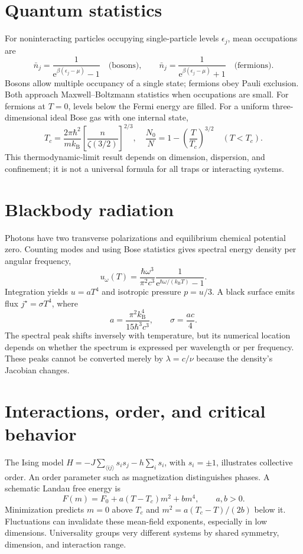 \documentclass[11pt,oneside]{book}
\newcommand{\ee}{\mathrm{e}}
\newcommand{\kb}{k_{\mathrm B}}
\theoremstyle{reviewstyle}
\begin{document}
\section{Quantum statistics}
For noninteracting particles occupying single-particle levels $\epsilon_j$, mean occupations are
\begin{equation}
\bar n_j=\frac1{\ee^{\beta(\epsilon_j-\mu)}-1}\quad\text{(bosons)},\qquad
\bar n_j=\frac1{\ee^{\beta(\epsilon_j-\mu)}+1}\quad\text{(fermions)}.
\end{equation}
Bosons allow multiple occupancy of a single state; fermions obey Pauli exclusion. Both approach Maxwell--Boltzmann statistics when occupations are small. For fermions at $T=0$, levels below the Fermi energy are filled. For a uniform three-dimensional ideal Bose gas with one internal state,
\begin{equation}
T_c=\frac{2\pi\hbar^2}{m\kb}\left[\frac{n}{\zeta(3/2)}\right]^{2/3},\quad
\frac{N_0}{N}=1-\left(\frac{T}{T_c}\right)^{3/2}\quad(T<T_c).
\end{equation}
This thermodynamic-limit result depends on dimension, dispersion, and confinement; it is not a universal formula for all traps or interacting systems.
\section{Blackbody radiation}
Photons have two transverse polarizations and equilibrium chemical potential zero. Counting modes and using Bose statistics gives spectral energy density per angular frequency,
\begin{equation}
u_\omega(T)=\frac{\hbar\omega^3}{\pi^2c^3}\frac1{\ee^{\hbar\omega/(\kb T)}-1}.
\end{equation}
Integration yields $u=aT^4$ and isotropic pressure $p=u/3$. A black surface emits flux $j^\star=\sigma T^4$, where
\begin{equation}a=\frac{\pi^2\kb^4}{15\hbar^3c^3},\qquad \sigma=\frac{ac}{4}.\end{equation}
The spectral peak shifts inversely with temperature, but its numerical location depends on whether the spectrum is expressed per wavelength or per frequency. These peaks cannot be converted merely by $\lambda=c/\nu$ because the density's Jacobian changes.
\section{Interactions, order, and critical behavior}
The Ising model $H=-J\sum_{\langle ij\rangle}s_is_j-h\sum_i s_i$, with $s_i=\pm1$, illustrates collective order. An order parameter such as magnetization distinguishes phases. A schematic Landau free energy is
\begin{equation}F(m)=F_0+a(T-T_c)m^2+bm^4,\qquad a,b>0.\end{equation}
Minimization predicts $m=0$ above $T_c$ and $m^2=a(T_c-T)/(2b)$ below it. Fluctuations can invalidate these mean-field exponents, especially in low dimensions. Universality groups very different systems by shared symmetry, dimension, and interaction range.
\end{document}
